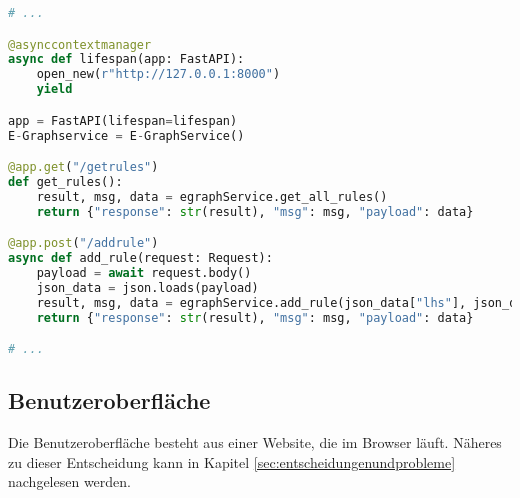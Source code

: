 \begin{lstlisting}[language=Python, caption=Auszug aus der Datei \textit{server.py}]
# ... 

@asynccontextmanager
async def lifespan(app: FastAPI):
    open_new(r"http://127.0.0.1:8000")
    yield

app = FastAPI(lifespan=lifespan)
E-Graphservice = E-GraphService()

@app.get("/getrules")
def get_rules():
    result, msg, data = egraphService.get_all_rules()
    return {"response": str(result), "msg": msg, "payload": data}

@app.post("/addrule")
async def add_rule(request: Request):
    payload = await request.body()
    json_data = json.loads(payload)
    result, msg, data = egraphService.add_rule(json_data["lhs"], json_data["rhs"])
    return {"response": str(result), "msg": msg, "payload": data}

# ... 
\end{lstlisting} 


\subsection{Benutzeroberfläche}

Die Benutzeroberfläche besteht aus einer Website, die im Browser läuft. Näheres zu dieser Entscheidung kann in Kapitel \ref{sec:entscheidungenundprobleme} nachgelesen werden.



